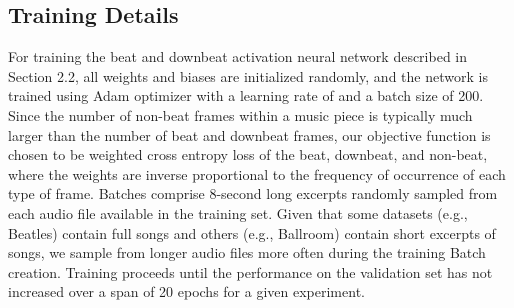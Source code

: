 \documentclass{article}
\begin{document}
\subsection{Training Details}
For training the beat and downbeat activation neural network described in Section 2.2, all weights and biases are initialized randomly, and the network is trained using Adam optimizer with a learning rate of  and a batch size of 200.
Since the number of non-beat frames within a music piece is typically much larger than the number of beat and downbeat frames, our objective function is chosen to be weighted cross entropy loss of the beat, downbeat, and non-beat, where the weights are inverse proportional to the frequency of occurrence of each type of frame.
Batches comprise 8-second long excerpts randomly sampled from each audio file available in the training set. Given that some datasets (e.g., Beatles) contain full songs and others (e.g., Ballroom) contain short excerpts of songs, we sample from longer audio files more often during the training Batch creation.
Training proceeds until the performance on the validation set has not increased over a span of 20 epochs for a given experiment.
\end{document}
